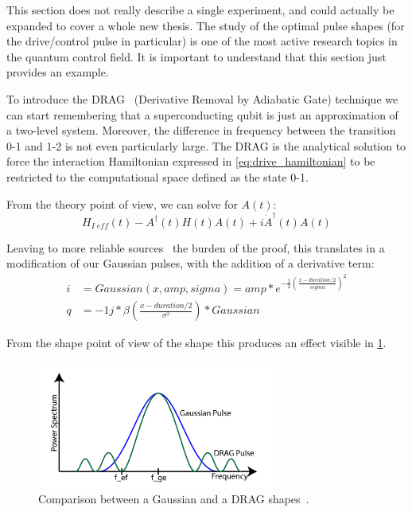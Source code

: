 
This section does not really describe a single experiment, and could actually be expanded to cover a whole new thesis.
The study of the optimal pulse shapes (for the drive/control pulse in particular) is one of the most active research topics in the quantum control field.
It is important to understand that this section just provides an example.

To introduce the DRAG~\cite{Gambetta2011} (Derivative Removal by Adiabatic Gate) technique we can start remembering that a superconducting qubit is just an approximation of a two-level system.
Moreover, the difference in frequency between the transition 0-1 and 1-2 is not even particularly large.
The DRAG is the analytical solution to force the interaction Hamiltonian expressed in \cref{eq:drive_hamiltonian} to be restricted to the computational space defined as the state 0-1.

From the theory point of view, we can solve for $A(t)$:
\begin{equation}
    H_{I\;eff}(t) - A^\dagger (t) H (t) A (t) + i \dot{A}^\dagger (t) A (t)
\end{equation}

Leaving to more reliable sources~\cite{Motzoi2009} the burden of the proof, this translates in a modification of our Gaussian pulses, with the addition of a derivative term:
\begin{align}
    i &= Gaussian(x,amp,sigma) = amp * e^{-\frac{1}{2}\left( \frac{x-duration/2}{sigma}\right)^2}\\
    q &= -1j * \beta \left( \frac{x - duration/2}{\sigma^2} \right) * Gaussian
\end{align}

From the shape point of view of the shape this produces an effect visible in \cref{fig:drag_shape}.
\begin{figure}[ht]
    \centering
    \includegraphics[width=8cm]{characterization/figures/DRAG_gaus.png}
    \caption{Comparison between a Gaussian and a DRAG shapes~\cite{Balasiu2017}.}
    \label{fig:drag_shape}
\end{figure}

